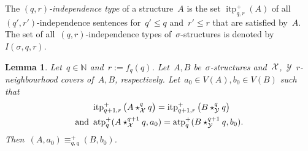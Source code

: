 \documentclass[11pt]{article}
\newtheorem{lemma}[theorem]{Lemma}
\numberwithin{equation}{section}
\newcommand{\N}{{\mathbb N}} \newcommand{\Q}{{\mathbb Q}}
\newcommand{\YYY}{\mathcal{Y}} \newcommand{\ZZZ}{\mathcal{Z}}
\newcommand{\atp}{\operatorname{atp}^+}
\newcommand{\itp}{\operatorname{itp}^+}
\begin{document}
The \emph{$(q,r)$-independence type} of a structure~$A$ is the set
$\itp_{q,r}(A)$ of all~$(q',r')$-independence sentences for~$q'\le q$
and~$r'\leq r$
that are satisfied by~$A$. The set of all~$(q,r)$-independence types
of~$\sigma$-structures is denoted by~$I(\sigma,q,r)$.

\begin{lemma}\label{lem:rplocality}
  Let~$q\in\N$ and~$r:=f_q(q)$. Let~$A,B$ be~$\sigma$-structures
  and~$\mathcal{X}$,~$\YYY$~$r$-neighbourhood covers of~$A,B$,
  respectively. Let~$a_0\in V(A), b_0\in V(B)$ such that
  \begin{align*}
    & \itp_{q+1,r}\big(A\star^q_{\XXX} q\big)
    =\itp_{q+1,r}\big(B\star^q_{\YYY}q\big)\\
    \text{and }& \atp_q(A\star^{q+1}_{\XXX} q , a_0)=\atp_q(B\star^{q+1}_{\YYY}q ,b_0).
  \end{align*}
  Then~$(A,a_0)\equiv^+_{q,q} (B,b_0)$.
\end{lemma}
\end{document}
